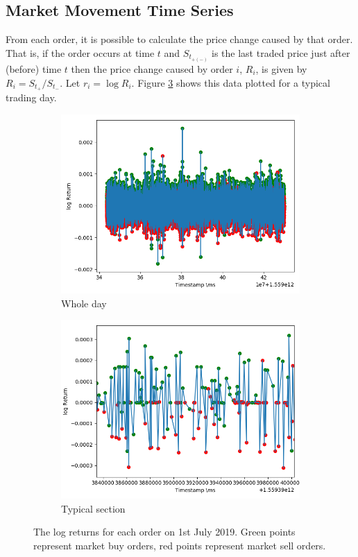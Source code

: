 \documentclass[a4paper,10pt]{article}
\begin{document}
\subsection{Market Movement Time Series}
From each order, it is possible to calculate the price change caused by that order. That is, if the order occurs at time $t$ and $S_{t_{+(-)}}$ is the last traded price just after (before) time $t$ then the price change caused by order $i$, $R_i$, is given by $R_i = S_{t_{+}} / S_{t_{-}}$. Let $r_i = \log R_i$. Figure \ref{log_returns} shows this data plotted for a typical trading day.  
\begin{figure}
    \centering
    \begin{subfigure}[b]{0.45\textwidth}
        \includegraphics[width=\textwidth]{images/log_returns_per_trade}
        \caption{Whole day}
        \label{fig:log_returns}
    \end{subfigure}
    \begin{subfigure}[b]{0.45\textwidth}
        \includegraphics[width=\textwidth]{images/log_returns_per_trade_zoom}
        \caption{Typical section}
        \label{fig:log_returns_zoom}
    \end{subfigure}
    \caption{The log returns for each order on 1st July 2019. Green points represent market buy orders, red points represent market sell orders.}
    \label{log_returns}
\end{figure}
\end{document}
